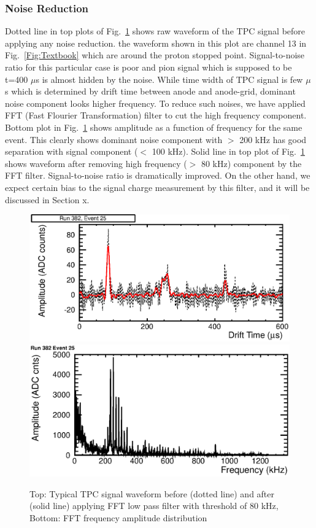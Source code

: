 \subsubsection{Noise Reduction}
Dotted line in top plots of Fig.~\ref{Fig:FFT} shows raw waveform of the TPC signal
before applying any noise reduction. the waveform shown in this plot
are channel 13 in Fig.~\ref{Fig:Textbook} which are around the proton stopped point.
Signal-to-noise ratio for this particular case is poor and pion signal 
which is supposed to be t=400 $\mu$s is almost hidden by the noise. 
While time width of TPC signal is few $\mu$s which is determined by
drift time between anode and anode-grid, dominant noise component looks
higher frequency. To reduce such noises, we have applied FFT 
(Fast Flourier Transformation) filter to cut the high frequency component.
Bottom plot in Fig.~\ref{Fig:FFT} shows amplitude as a function of frequency
for the same event. This clearly shows dominant noise component with
$>$ 200 kHz has good separation with signal component ($<$ 100 kHz).
Solid line in top plot of Fig.~\ref{Fig:FFT} shows waveform after removing high frequency
($>$ 80 kHz) component by the FFT filter. Signal-to-noise ratio is dramatically
improved. On the other hand, we expect certain bias to the signal charge
measurement by this filter, and it will be discussed in Section x.

\begin{figure}[htbp]
 \begin{center}
  \includegraphics[width=1.0\hsize]{fig/beforeafterFFT.eps}
  \includegraphics[width=1.0\hsize]{fig/FFT.eps}
 \end{center}
 \caption{Top: Typical TPC signal waveform before (dotted line) and after (solid line) applying FFT low pass filter with threshold of 80 kHz,
Bottom: FFT frequency amplitude distribution}
 \label{Fig:FFT}
\end{figure}


